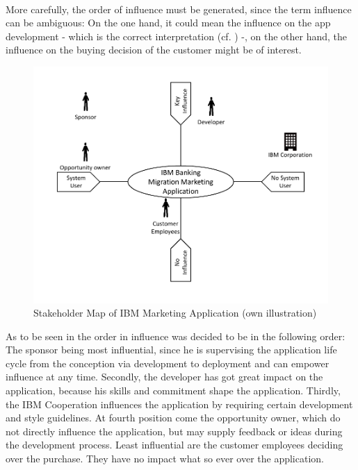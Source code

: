 \paragraph{} More carefully, the order of influence must be generated, since the term influence can be ambiguous: On the one hand, it could mean the influence on the app development - which is the correct interpretation (cf. \Cref{}) -, on the other hand, the influence on the buying decision of the customer might be of interest.


\begin{figure}[H]
    \centering
    \includegraphics[height=.5\textheight]{img/smMarketingApp.pdf}
    \caption[Stakeholder Map of IBM Marketing Application]{Stakeholder Map of IBM Marketing Application (own illustration)}
    \label{fig:smIBM}
\end{figure}

As to be seen in  the order in influence was decided to be in the following order: The sponsor being most influential, since he is supervising the application life cycle from the conception via development to deployment and can empower influence at any time. Secondly, the developer has got great impact on the application, because his skills and commitment shape the application. Thirdly, the IBM Cooperation influences the application by requiring certain development and style guidelines. At fourth position come the opportunity owner, which do not directly influence the application, but may supply feedback or ideas during the development process. Least influential are the customer employees deciding over the purchase. They have no impact what so ever over the application. 

